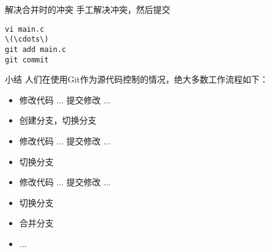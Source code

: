 \begin{frame}[fragile]{解决合并时的冲突}
\onslide<+->
手工解决冲突，然后提交
\begin{Verbatim}[frame=single,commandchars=\\\{\}]
vi main.c
\(\cdots\)
git add main.c
git commit
\end{Verbatim}
\end{frame}

\begin{frame}{小结}
人们在使用Git作为源代码控制的情况，绝大多数工作流程如下：
    \begin{itemize}
        \item 修改代码 \(\ldots\) 提交修改 \(\ldots\)
        \item 创建分支，切换分支
        \item 修改代码 \(\ldots\) 提交修改 \(\ldots\)
        \item 切换分支
        \item 修改代码 \(\ldots\) 提交修改 \(\ldots\)
        \item 切换分支
        \item 合并分支
        \item \(\ldots\)
    \end{itemize}
\end{frame}
